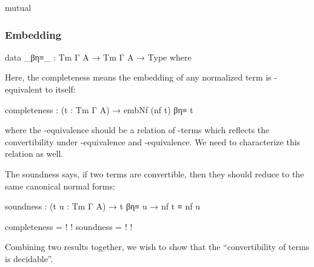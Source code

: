 \begin{code}[hide]
mutual
\end{code}

\subsubsection*{Embedding}


\begin{code}[hide]
data _βη≡_ : Tm Γ A → Tm Γ A → Type where
\end{code}

Here, the completeness means the embedding of any normalized term is \beta\eta-equivalent to itself:

\begin{code}
completeness : (t : Tm Γ A) → embNf (nf t) βη≡ t
\end{code}

where the \beta\eta-equivalence should be a relation of \lambda-terms which reflects the convertibility under \beta-equivalence and \eta-equivalence. We need to characterize this relation as well.

The soundness says, if two terms are convertible, then they should reduce to the same canonical normal forms:

\begin{code}
soundness : (t u : Tm Γ A) → t βη≡ u → nf t ≡ nf u
\end{code}

\begin{code}[hide]
completeness = {!   !}
soundness = {!   !}
\end{code}

Combining two results together, we wish to show that the ``convertibility of terms is decidable''.